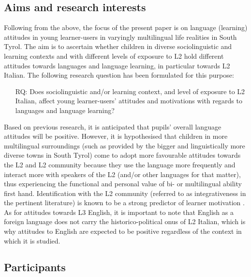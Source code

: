 \documentclass[output=paper]{../langscibook}
\begin{document}
\subsection{Aims and research interests}


Following from the above, the focus of the present paper is on language (learning) attitudes in young learner-users in varyingly multilingual life realities in South Tyrol. The aim is to ascertain whether children in diverse sociolinguistic and learning contexts and with different levels of exposure to L2 hold different attitudes towards languages and language learning, in particular towards L2 Italian. The following research question has been formulated for this purpose:

\begin{itemize}
\item [RQ:] Does sociolinguistic and/or learning context, and level of exposure to L2 Italian, affect young learner-users’ attitudes and motivations with regards to languages and language learning?
\end{itemize}

Based on previous research, it is anticipated that pupils’ overall language attitudes will be positive. However, it is hypothesised that children in more multilingual surroundings (such as provided by the bigger and linguistically more diverse towns in South Tyrol) come to adopt more favourable attitudes towards the L2 and L2 community because they use the language more frequently and interact more with speakers of the L2 (and/or other languages for that matter), thus experiencing the functional and personal value of bi- or multilingual ability first hand.  Identification with the L2 community (referred to as integrativeness in the pertinent literature) is known to be a strong predictor of learner motivation \citep{Gardner1985}. As for attitudes towards L3 English, it is important to note that English as a foreign language does not carry the historico-political onus of L2 Italian, which is why attitudes to English are expected to be positive regardless of the context in which it is studied.

\subsection{Participants}
\end{document}
